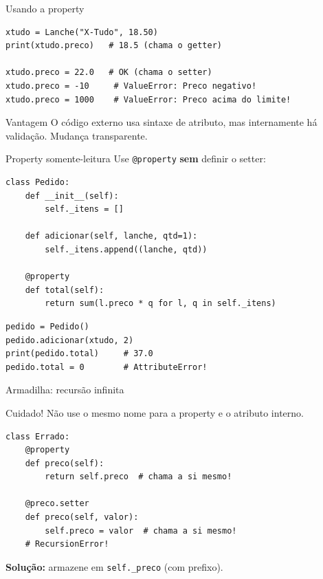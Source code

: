 \documentclass[aspectratio=169]{beamer}
\begin{document}
\begin{frame}[fragile]{Usando a property}
\begin{lstlisting}
xtudo = Lanche("X-Tudo", 18.50)
print(xtudo.preco)   # 18.5 (chama o getter)

xtudo.preco = 22.0   # OK (chama o setter)
xtudo.preco = -10     # ValueError: Preco negativo!
xtudo.preco = 1000    # ValueError: Preco acima do limite!
\end{lstlisting}

\begin{block}{Vantagem}
O código externo usa sintaxe de atributo, mas internamente
há validação. Mudança transparente.
\end{block}
\end{frame}

\begin{frame}[fragile]{Property somente-leitura}
Use \texttt{@property} \textbf{sem} definir o setter:

\begin{lstlisting}
class Pedido:
    def __init__(self):
        self._itens = []

    def adicionar(self, lanche, qtd=1):
        self._itens.append((lanche, qtd))

    @property
    def total(self):
        return sum(l.preco * q for l, q in self._itens)
\end{lstlisting}

\begin{lstlisting}
pedido = Pedido()
pedido.adicionar(xtudo, 2)
print(pedido.total)     # 37.0
pedido.total = 0        # AttributeError!
\end{lstlisting}
\end{frame}

\begin{frame}[fragile]{Armadilha: recursão infinita}
\begin{alertblock}{Cuidado!}
Não use o mesmo nome para a property e o atributo interno.
\end{alertblock}

\begin{lstlisting}
class Errado:
    @property
    def preco(self):
        return self.preco  # chama a si mesmo!

    @preco.setter
    def preco(self, valor):
        self.preco = valor  # chama a si mesmo!
    # RecursionError!
\end{lstlisting}

\textbf{Solução:} armazene em \texttt{self.\_preco} (com prefixo).
\end{frame}
\end{document}
